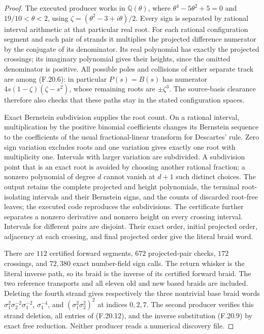 \begin{proof}
The executed producer
works in $\mathbb Q(\theta)$, where
$\theta^4-5\theta^2+5=0$ and $19/10<\theta<2$, using
$\zeta=(\theta^2-3+i\theta)/2$.
Every sign is separated by rational interval arithmetic
at that particular real root.
For each rational configuration segment and each pair
of strands it multiplies the projected difference
numerator by the conjugate of its denominator.
Its real polynomial has exactly the projected
crossings; its imaginary polynomial gives their
heights, since the omitted denominator is positive.
All possible poles and collisions of either separate
track are among (F.20.6): in particular
$P(s)=B(s)$ has numerator
$4s(1-\zeta)(\zeta-s^2)$, whose remaining roots
are $\pm\zeta^3$.
The source-basis clearance therefore also checks that
these paths stay in the stated configuration spaces.

Exact Bernstein subdivision supplies the root count.
On a rational interval, multiplication by the positive
binomial coefficients changes its Bernstein sequence
to the coefficients of the usual fractional-linear
transform for Descartes' rule. Zero sign variation
excludes roots and one variation gives exactly one
root with multiplicity one. Intervals with larger
variation are subdivided. A subdivision point that
is an exact root is avoided by choosing another
rational fraction; a nonzero polynomial of degree
$d$ cannot vanish at $d+1$ such distinct choices.
The output retains the complete projected and height
polynomials, the terminal root-isolating intervals
and their Bernstein signs, and the counts of discarded
root-free leaves; the executed code reproduces the
subdivisions. The certificate further
separates a nonzero derivative and nonzero height
on every crossing interval.
Intervals for different pairs are disjoint.
Their exact order, initial projected order,
adjacency at each crossing, and final projected
order give the literal braid word.

There are $112$ certified forward segments,
$672$ projected-pair checks, $172$ crossings, and
$72,380$ exact number-field sign calls.
The return whisker is the literal inverse path,
so its braid is the inverse of its certified
forward braid. The two reference transports and
all eleven old and new based braids are included.
Deleting the fourth strand gives respectively the
three nontrivial base braid words
$\sigma_1^2\sigma_2^{-2}\sigma_1^{-2}$,
$\sigma_1^{-4}$, and
$(\sigma_1^2\sigma_2^2)^2$ at indices $0,2,7$.
The second producer verifies this strand deletion,
all entries of (F.20.12), and the inverse substitution
(F.20.9) by exact free reduction.
Neither producer reads a numerical discovery file.


\end{proof}
